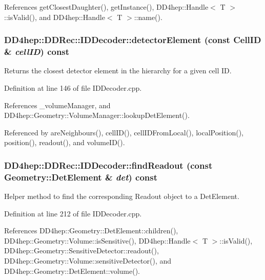References getClosestDaughter(), getInstance(), DD4hep::Handle$<$ T $>$::isValid(), and DD4hep::Handle$<$ T $>$::name().\hypertarget{class_d_d4hep_1_1_d_d_rec_1_1_i_d_decoder_aff2e1cdc9747a3d0de2df26f8f3f9704}{
\subsubsection[{detectorElement}]{ DD4hep::DDRec::IDDecoder::detectorElement (const {\bf CellID} \& {\em cellID}) const}}
\label{class_d_d4hep_1_1_d_d_rec_1_1_i_d_decoder_aff2e1cdc9747a3d0de2df26f8f3f9704}


Returns the closest detector element in the hierarchy for a given cell ID. 

Definition at line 146 of file IDDecoder.cpp.

References \_\-volumeManager, and DD4hep::Geometry::VolumeManager::lookupDetElement().

Referenced by areNeighbours(), cellID(), cellIDFromLocal(), localPosition(), position(), readout(), and volumeID().\hypertarget{class_d_d4hep_1_1_d_d_rec_1_1_i_d_decoder_a1327b3c8e2152ab29ef2a26047460c59}{
\subsubsection[{findReadout}]{ DD4hep::DDRec::IDDecoder::findReadout (const {\bf Geometry::DetElement} \& {\em det}) const}}
\label{class_d_d4hep_1_1_d_d_rec_1_1_i_d_decoder_a1327b3c8e2152ab29ef2a26047460c59}


Helper method to find the corresponding Readout object to a DetElement. 

Definition at line 212 of file IDDecoder.cpp.

References DD4hep::Geometry::DetElement::children(), DD4hep::Geometry::Volume::isSensitive(), DD4hep::Handle$<$ T $>$::isValid(), DD4hep::Geometry::SensitiveDetector::readout(), DD4hep::Geometry::Volume::sensitiveDetector(), and DD4hep::Geometry::DetElement::volume().

